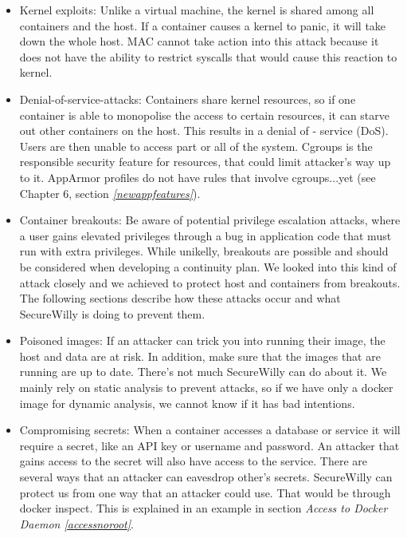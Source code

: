 \begin{itemize}
\item Kernel exploits: Unlike a virtual machine, the kernel is shared among all containers and the host. If a container causes a kernel to panic, it will take down the whole host.
MAC cannot take action into this attack because it does not have the ability to restrict syscalls that would cause this reaction to kernel.

\item Denial-of-service-attacks: Containers share kernel resources, so if one container is able to monopolise the access to certain resources, it can starve out other containers on the host. This results in a denial of - service (DoS). Users are then unable to access part or all of the system.
Cgroups is the responsible security feature for resources, that could limit attacker's way up to it. AppArmor profiles do not have rules that involve cgroups...yet (see Chapter 6, section \textit{\ref{newappfeatures}}).

\item Container breakouts: Be aware of potential privilege escalation attacks, where a user gains elevated privileges through a bug in application code that must run with extra privileges. While unikelly, breakouts are possible and should be considered  when developing a continuity plan.
We looked into this kind of attack closely and we achieved to protect host and containers from breakouts. The following sections describe how these attacks occur and what SecureWilly is doing to prevent them.

\item Poisoned images: If an attacker can trick you into running their image, the host and data are at risk. In addition, make sure that the images that are running are up to date.
There's not much SecureWilly can do about it. We mainly rely on static analysis to prevent attacks, so if we have only a docker image for dynamic analysis, we cannot know if it has bad intentions.

\item Compromising secrets: When a container accesses a database or service it will require a secret, like an API key or username and password. An attacker that gains access to the secret will also have access to the service.
There are several ways that an attacker can eavesdrop other's secrets. SecureWilly can protect us from one way that an attacker could use. That would be through docker inspect. This is explained in an example in section \textit{Access to Docker Daemon \ref{accessnoroot}}.

\end{itemize}

